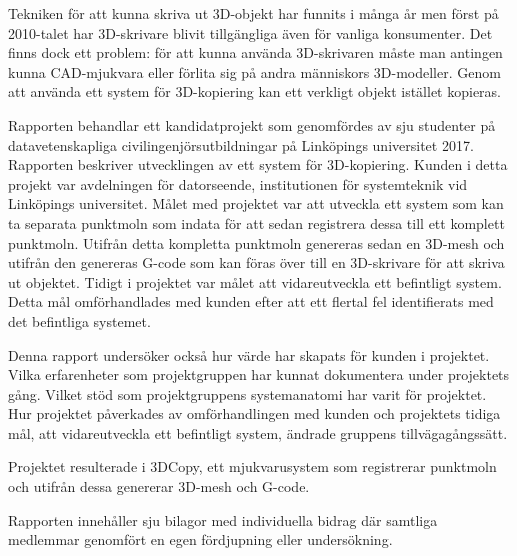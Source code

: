 Tekniken för att kunna skriva ut 3D-objekt har funnits i många år men först på 2010-talet har 3D-skrivare blivit tillgängliga även för vanliga konsumenter. Det finns dock ett problem: för att kunna använda 3D-skrivaren måste man antingen kunna CAD-mjukvara eller förlita sig på andra människors 3D-modeller. Genom att använda ett system för 3D-kopiering kan ett verkligt objekt istället kopieras.

Rapporten behandlar ett kandidatprojekt som genomfördes av sju studenter på datavetenskapliga civilingenjörsutbildningar på Linköpings universitet 2017. Rapporten beskriver utvecklingen av ett system för 3D-kopiering. Kunden i detta projekt var avdelningen för datorseende, institutionen för systemteknik vid Linköpings universitet. Målet med projektet var att utveckla ett system som kan ta separata punktmoln som indata för att sedan registrera dessa till ett komplett punktmoln. Utifrån detta kompletta punktmoln genereras sedan en 3D-mesh och utifrån den genereras G-code som kan föras över till en 3D-skrivare för att skriva ut objektet.
Tidigt i projektet var målet att vidareutveckla ett befintligt system. Detta mål omförhandlades med kunden efter att ett flertal fel identifierats med det befintliga systemet. 

Denna rapport undersöker också hur värde har skapats för kunden i projektet. Vilka erfarenheter som projektgruppen har kunnat dokumentera under projektets gång. Vilket stöd som projektgruppens systemanatomi har varit för projektet. Hur projektet påverkades av omförhandlingen med kunden och projektets tidiga mål, att vidareutveckla ett befintligt system, ändrade gruppens tillvägagångssätt.  

Projektet resulterade i 3DCopy, ett mjukvarusystem som registrerar punktmoln och utifrån dessa genererar 3D-mesh och G-code.

Rapporten innehåller sju bilagor med individuella bidrag där samtliga medlemmar genomfört en egen fördjupning eller undersökning. 

